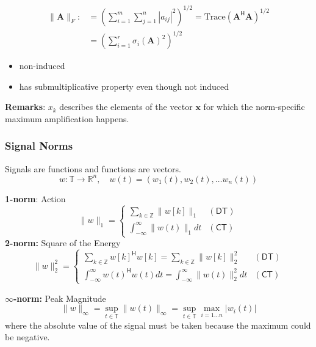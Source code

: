 
\noindent\begin{align*}
    \|\mathbf{A}\|_F: & ={\left(\sum_{i=1}^m\sum_{j=1}^n|a_{ij}|^2\right)}^{1/2}=\text{Trace}{(\mathbf{A}^{\mathsf{H}}\mathbf{A})}^{1/2} \\
                      & = {\left(\sum_{i=1}^r\sigma_i{(\mathbf{A})}^2\right)}^{1/2}
\end{align*}

\begin{itemize}
    \item non-induced
    \item has submultiplicative property even though not induced
\end{itemize}

\textbf{Remarks}: $x_k$ describes the elements of the vector $\mathbf{x}$ for which the norm-specific maximum amplification happens.

\subsubsection{Signal Norms}
Signals are functions and functions are vectors.
\noindent\begin{equation*}
    w:\mathbb{T}\rightarrow \mathbb{R}^n, \quad w(t)=(w_1(t), w_2(t), \ldots w_n(t))
\end{equation*}

\textbf{1-norm}: Action
\noindent\begin{equation*}
    \|w\|_1=\begin{cases}
        \sum\limits_{k\in\mathbb{Z}}\|w[k]\|_1 & (\mathsf{DT}) \\
        \int_{-\infty}^\infty\|w(t)\|_1 dt     & (\mathsf{CT})
    \end{cases}
\end{equation*}
\newpar{}
\textbf{2-norm:} Square of the Energy
\noindent\begin{equation*}
    \|w\|_2^2=
    \begin{cases}
        \sum\limits_{k\in\mathbb{Z}}{w[k]}^{\mathsf{H}}w[k] = \sum\limits_{k\in\mathbb{Z}}\|w[k]\|_2^2 & \mathsf{(DT)} \\
        \int_{-\infty}^\infty {w(t)}^{\mathsf{H}}w(t) dt = \int_{-\infty}^\infty\|w(t)\|_2^2 dt        & \mathsf{(CT)}
    \end{cases}
\end{equation*}

\newpar{}
\textbf{$\infty$-norm:} Peak Magnitude
\noindent\begin{equation*}
    \|w\|_\infty=\sup_{t\in\mathbb{T}}\|w(t)\|_\infty=\sup_{t\in\mathbb{T}}\max_{i=1\ldots n}|w_i(t)|
\end{equation*}
where the absolute value of the signal must be taken because the maximum could be negative.

